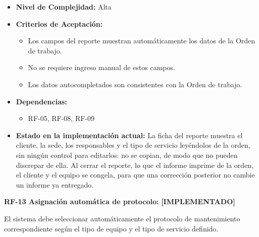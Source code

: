 \documentclass[12pt,a4paper]{article}
\newcommand{\estadoImplementado}{\textcolor{mainRed}{\textbf{[IMPLEMENTADO]}}}
\begin{document}
\begin{itemize}
  \item \textbf{Nivel de Complejidad:} Alta

  \item \textbf{Criterios de Aceptación:}
  \begin{itemize}
    \item Los campos del reporte muestran automáticamente los datos de la Orden de trabajo.
    \item No se requiere ingreso manual de estos campos.
    \item Los datos autocompletados son consistentes con la Orden de trabajo.
  \end{itemize}

  \item \textbf{Dependencias:}
  \begin{itemize}
    \item RF-05, RF-08, RF-09
  \end{itemize}

  \item \textbf{Estado en la implementación actual:} La ficha del reporte muestra el cliente, la sede, los responsables y el tipo de servicio leyéndolos de la orden, sin ningún control para editarlos: no se copian, de modo que no pueden discrepar de ella. Al cerrar el reporte, lo que el informe imprime de la orden, el cliente y el equipo se congela, para que una corrección posterior no cambie un informe ya entregado.
\end{itemize}

\textbf{RF-13 Asignación automática de protocolo:} \estadoImplementado{}

El sistema debe seleccionar automáticamente el protocolo de mantenimiento correspondiente según el tipo de equipo y el tipo de servicio definido.
\end{document}

